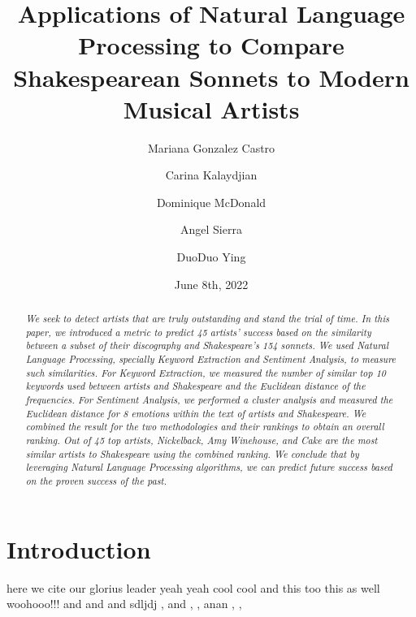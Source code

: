 \documentclass[10pt,a4paper]{article}
\title{Applications of Natural Language Processing to Compare Shakespearean Sonnets to Modern Musical Artists}
\author[*]{Mariana Gonzalez Castro}
\author[*]{Carina Kalaydjian}
\author[*]{Dominique McDonald}
\author[*]{Angel Sierra}
\author[*]{DuoDuo Ying}
\affil[*]{Department of Statistics, UCLA}
\date{June 8th, 2022}
\newcommand{\abstractinenglishname}{Abstract}
\newenvironment{abstractinenglish}{
        \def\abstractname{\abstractinenglishname}
	\begin{abstract}
}{
        \end{abstract}
}
\begin{document}
\maketitle
\vspace{6pt}

\begin{abstractinenglish}
\emph{We seek to detect artists that are truly outstanding and stand the trial of time. In this paper, we introduced a metric to predict 45 artists’ success based on the similarity between a subset of their discography and Shakespeare’s 154 sonnets. We used Natural Language Processing, specially Keyword Extraction and Sentiment Analysis, to measure such similarities. For Keyword Extraction, we measured the number of similar top 10 keywords used between artists and Shakespeare and the Euclidean distance of the frequencies. For Sentiment Analysis, we performed a cluster analysis and measured the Euclidean distance for 8 emotions within the text of artists and Shakespeare. We combined the result for the two methodologies and their rankings to obtain an overall ranking. Out of 45 top artists, Nickelback, Amy Winehouse, and Cake are the most similar artists to Shakespeare using the combined ranking. We conclude that by leveraging Natural Language Processing algorithms, we can predict future success based on the proven success of the past. }
\end{abstractinenglish}

\section{Introduction}
%


here we cite \cite{web1} our glorius leader \cite{web2} yeah yeah cool cool \cite{briney2015data} and this too \cite{monkey} this as well \cite{sonnetsData} woohooo!!! \cite{musicData} and \cite{syuzhet} and \cite{tm} and \cite{shakeFacts} sdljdj \cite{k-means} , \cite{NLP-for-music} and  \cite{NLP-for-lyrics}, \cite{knowledge-graphs}, \cite{nrc-sentiment}anan \cite{music-world}, \cite{bio-article1}, \cite{bio-article2}
\end{document}
